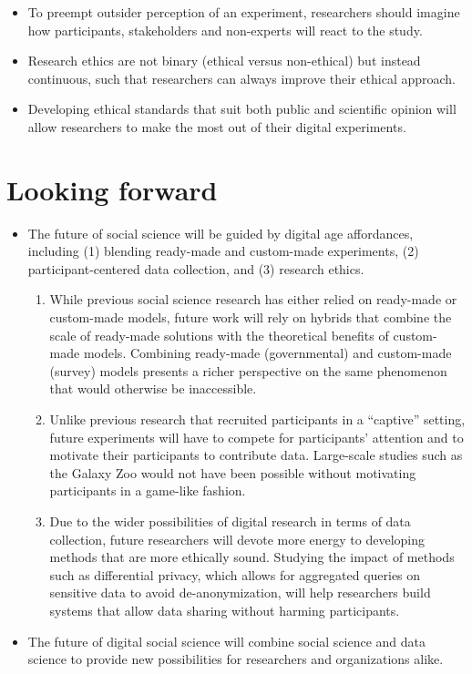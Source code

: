 \documentclass[11pt,letterpaper]{article}
\begin{document}
\begin{itemize}
\item To preempt outsider perception of an experiment, researchers should imagine how participants, stakeholders and non-experts will react to the study.
\item Research ethics are not binary (ethical versus non-ethical) but instead continuous, such that researchers can always improve their ethical approach. 
\item Developing ethical standards that suit both public and scientific opinion will allow researchers to make the most out of their digital experiments.
\end{itemize}

\section{Looking forward}
\begin{itemize}
\item The future of social science will be guided by digital age affordances, including (1) blending ready-made and custom-made experiments, (2) participant-centered data collection, and (3) research ethics.
\begin{enumerate}
\item While previous social science research has either relied on ready-made or custom-made models, future work will rely on hybrids that combine the scale of ready-made solutions with the theoretical benefits of custom-made models. Combining ready-made (governmental) and custom-made (survey) models presents a richer perspective on the same phenomenon that would otherwise be inaccessible.
\item Unlike previous research that recruited participants in a ``captive'' setting, future experiments will have to compete for participants' attention and to motivate their participants to contribute data. Large-scale studies such as the Galaxy Zoo would not have been possible without motivating participants in a game-like fashion.
\item Due to the wider possibilities of digital research in terms of data collection, future researchers will devote more energy to developing methods that are more ethically sound. Studying the impact of methods such as differential privacy, which allows for aggregated queries on sensitive data to avoid de-anonymization, will help researchers build systems that allow data sharing without harming participants.
\end{enumerate}
\item The future of digital social science will combine social science and data science to provide new possibilities for researchers and organizations alike.
\end{itemize}
\end{document}
